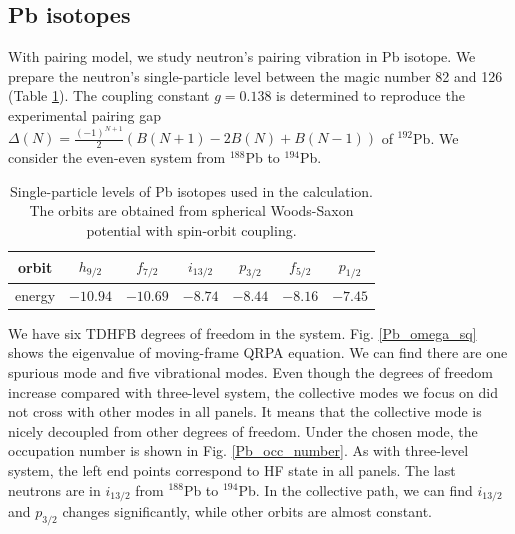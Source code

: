\documentclass[%
superscriptaddress,
showpacs,
nofootinbib,
amsmath,amssymb,
aps,
prc,
twocolumn,
floatfix ]%
{revtex4-1}
\begin{document}
\subsection{Pb isotopes}
With pairing model, we study neutron's pairing vibration in Pb isotope. We prepare the neutron's single-particle level between the magic number 82 and 126 (Table \ref{Pb}). The coupling constant $g=0.138$ is determined to reproduce the experimental pairing gap $\Delta(N)=\frac{(-1)^{N+1}}{2}(B(N+1)-2B(N)+B(N-1))$ of ${}^{192}$Pb. We consider the even-even system from ${}^{188}$Pb to ${}^{194}$Pb.
\begin{table}[htbp]
\begin{ruledtabular}
\begin{tabular}{c|cccccc}
  orbit& $h_{9/2}$ & $f_{7/2}$ & $i_{13/2}$ & $p_{3/2}$ & $f_{5/2}$ & $p_{1/2}$\\ \hline
  energy& $-10.94$ & $-10.69$ & $-8.74$ & $-8.44$ & $-8.16$ & $-7.45$\\
\end{tabular}
\end{ruledtabular}
\caption{Single-particle levels of Pb isotopes used in the calculation. The orbits are obtained from spherical Woods-Saxon potential with spin-orbit coupling. }
\label{Pb}
\end{table}

We have six TDHFB degrees of freedom in the system. Fig. \ref{Pb_omega_sq} shows the eigenvalue of moving-frame QRPA equation. We can find there are one spurious mode and five vibrational modes. Even though the degrees of freedom increase compared with three-level system, the collective modes we focus on did not cross with other modes in all panels. It means that the collective mode is nicely decoupled from other degrees of freedom. Under the chosen mode, the occupation number is shown in Fig. \ref{Pb_occ_number}. As with three-level system, the left end points correspond to HF state in all panels. The last neutrons are in $i_{13/2}$ from ${}^{188}$Pb to ${}^{194}$Pb. In the collective path, we can find $i_{13/2}$ and $p_{3/2}$ changes significantly, while other orbits are almost constant.
\end{document}
